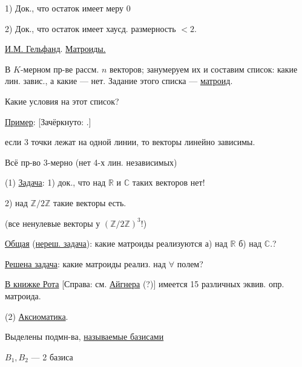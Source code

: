 

1) Док., что остаток имеет меру $0$

2) Док., что остаток имеет хаусд. размерность $<2$.


\underline{\underline{И.М. Гельфанд}}. \underline{Матроиды.}

В $K$-мерном пр-ве рассм. $n$ векторов;
занумеруем их и составим список: какие лин. завис., а какие — нет.
Задание этого списка — \underline{матроид}.

Какие условия на этот список?

\underline{Пример}:
[Зачёркнуто: .]



если 3 точки лежат на одной линии, то векторы
линейно зависимы.

Всё пр-во 3-мерно (нет 4-х лин. независимых)

(1) \underline{Задача}: 1) док., что над $\mathbb{R}$ и $\mathbb{C}$ таких векторов нет!

2) над $\mathbb{Z}/2\mathbb{Z}$ такие векторы есть.

(все ненулевые векторы у $(\mathbb{Z}/2\mathbb{Z})^3$!)

\underline{Общая} (\underline{нереш. задача}): какие матроиды реализуются
а) над $\mathbb{R}$
б) над $\mathbb{C}$.?

\underline{Решена задача}: какие матроиды реализ. над $\forall$ полем?

\underline{В книжке Рота} 
[Справа: см.  \underline{Айгнера} (?)]
имеется 15 различных эквив. опр. матроида.

(2) \underline{Аксиоматика}.

Выделены подмн-ва, \underline{называемые базисами}

$B_1,B_2$ — 2 базиса


